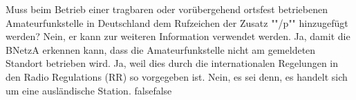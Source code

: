     {Muss beim Betrieb einer tragbaren oder vorübergehend ortsfest betriebenen Amateurfunkstelle in Deutschland dem Rufzeichen der Zusatz ""/p"" hinzugefügt werden?}
    {Nein, er kann zur weiteren Information verwendet werden.}
    {Ja, damit die BNetzA erkennen kann, dass die Amateurfunkstelle nicht am gemeldeten Standort betrieben wird.}
    {Ja, weil dies durch die internationalen Regelungen in den Radio Regulations (RR) so vorgegeben ist.}
    {Nein, es sei denn, es handelt sich um eine ausländische Station.}
    {false}{false}